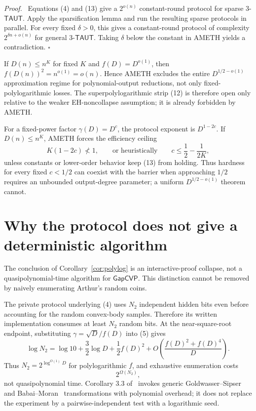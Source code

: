 \documentclass[11pt]{article}
\newenvironment{proof}{\par\noindent\textit{Proof.}\ }{\hfill$\square$\par}
\newcommand{\GapCVP}{\mathsf{GapCVP}}
\newcommand{\TAUT}{\mathsf{TAUT}}
\begin{document}
\begin{proof}
Equations (4) and (13) give a $2^{o(n)}$ constant-round protocol for sparse
$3$-$\TAUT$.  Apply the sparsification lemma and run the resulting sparse protocols in
parallel.  For every fixed $\delta>0$, this gives a constant-round protocol
of complexity $2^{\delta n+o(n)}$ for general $3$-$\TAUT$.  Taking
$\delta$ below the constant in AMETH yields a contradiction.
\end{proof}

If $D(n)\le n^K$ for fixed $K$ and $f(D)=D^{o(1)}$, then
$f(D(n))^2=n^{o(1)}=o(n)$.  Hence AMETH excludes the entire
$D^{1/2-o(1)}$ approximation regime for polynomial-output reductions, not
only fixed-polylogarithmic losses.  The superpolylogarithmic strip (12) is
therefore open only relative to the weaker EH-noncollapse assumption; it is
already forbidden by AMETH.

For a fixed-power factor $\gamma(D)=D^c$, the protocol exponent is
$D^{1-2c}$.  If $D(n)\le n^K$, AMETH forces the efficiency ceiling
\[
  K(1-2c)\not<1,
  \qquad\text{or heuristically}\qquad
  c\le\frac12-\frac{1}{2K},                              \tag{15}
\]
unless constants or lower-order behavior keep (13) from holding.  Thus
hardness for every fixed $c<1/2$ can coexist with the barrier when approaching
$1/2$ requires an unbounded output-degree parameter; a uniform
$D^{1/2-o(1)}$ theorem cannot.

\section{Why the protocol does not give a deterministic algorithm}

The conclusion of Corollary~\ref{cor:polylog} is an interactive-proof
collapse, not a quasipolynomial-time algorithm for $\GapCVP$.  This distinction
cannot be removed by naively enumerating Arthur's random coins.

The private protocol underlying (4) uses $N_2$ independent hidden bits even
before accounting for the random convex-body samples.  Therefore its written
implementation consumes at least $N_2$ random bits.  At the near-square-root
endpoint, substituting $\gamma=\sqrt D/f(D)$ into (5) gives
\[
  \log N_2
  =\log 10+\frac32\log D+\frac12f(D)^2
   +O\!\left(\frac{f(D)^2+f(D)^4}{D}\right).             \tag{16}
\]
Thus $N_2=2^{\log^{O(1)}D}$ for polylogarithmic $f$, and exhaustive
enumeration costs
\[
  2^{\Omega(N_2)},
\]
not quasipolynomial time.  Corollary 3.3 of~\cite{ABBGKLPV22} invokes generic
Goldwasser--Sipser~\cite{GS89} and Babai--Moran~\cite{BM88}
transformations with polynomial overhead;
it does not replace the experiment by a pairwise-independent test with a
logarithmic seed.
\end{document}
